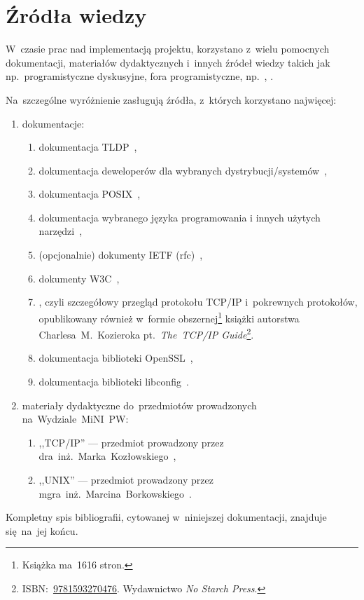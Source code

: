 \documentclass[thesis]{subfiles}
\begin{document}

\section{Źródła wiedzy}

W~czasie prac nad implementacją projektu, korzystano z~wielu pomocnych dokumentacji, materiałów dydaktycznych i~innych źródeł wiedzy takich jak np.~programistyczne dyskusyjne, fora programistyczne, np.~, .

\noindent Na~szczególne wyróżnienie zasługują źródła, z~których korzystano najwięcej:
\begin{enumerate}
	\item dokumentacje:
	\begin{enumerate}
		\item dokumentacja TLDP~\cite{tldp},
		\item dokumentacja deweloperów dla wybranych dystrybucji/systemów~\cite{archlinux-wiki,gentoo-wiki},
		\item dokumentacja POSIX~\cite{posix},
		\item dokumentacja wybranego języka programowania i innych użytych narzędzi~\cite{glibc-doc},
		\item (opcjonalnie) dokumenty IETF (\gls{rfc})~\cite{rfc-editor},
		\item dokumenty W3C~\cite{w3c},
		\item {}, czyli szczegółowy przegląd protokołu TCP/IP i~pokrewnych protokołów, opublikowany również w~formie obszernej\footnote{Książka ma~1616 stron.} książki autorstwa \mbox{Charlesa~M.~Kozieroka} pt.~\textit{The~TCP/IP Guide}\footnote{ISBN:~\href{https://www.nostarch.com/tcpip.htm}{9781593270476}. Wydawnictwo \emph{No Starch Press}.}.
		\item dokumentacja biblioteki OpenSSL~\cite{openssl-doc},
		\item dokumentacja biblioteki libconfig~\cite{libconfig-doc}.
	\end{enumerate}
	\item materiały dydaktyczne do~przedmiotów prowadzonych na~Wydziale~MiNI~PW:
	\begin{enumerate}
		\item ,,TCP/IP'' --- przedmiot prowadzony przez dra~inż.~Marka~Kozłowskiego~\cite{kozlowski},
		\item ,,UNIX'' --- przedmiot prowadzony przez mgra~inż.~Marcina~Borkowskiego~\cite{borkowski}.
	\end{enumerate}
\end{enumerate}
Kompletny spis bibliografii, cytowanej w~niniejszej dokumentacji, znajduje się~na~jej końcu.
\end{document}
